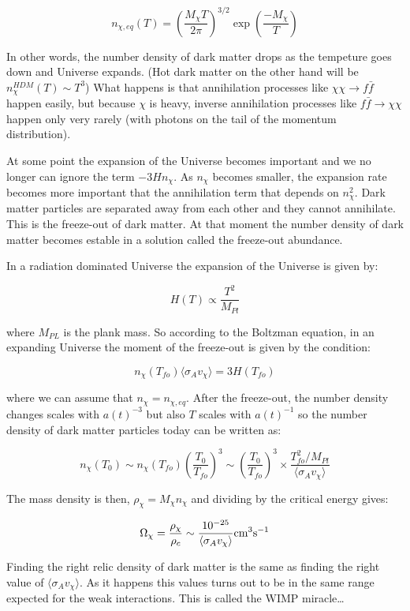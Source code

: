 \documentclass[
  letterpaper,
  DIV=11,
  numbers=noendperiod]{scrreprt}
\begin{document}
\[n_{\chi, eq}(T)  = \left(\frac{M_\chi T}{2\pi}\right)^{3/2} \exp \left(\frac{-M_\chi}{T}\right)\]

In other words, the number density of dark matter drops as the tempeture
goes down and Universe expands. (Hot dark matter on the other hand will
be \(n^{HDM}_\chi(T) \sim T^3\)) What happens is that annihilation
processes like \(\chi \chi \rightarrow f\bar{f}\) happen easily, but
because \(\chi\) is heavy, inverse annihilation processes like
\(f\bar{f} \rightarrow \chi\chi\) happen only very rarely (with photons
on the tail of the momentum distribution).

At some point the expansion of the Universe becomes important and we no
longer can ignore the term \(-3Hn_\chi\). As \(n_\chi\) becomes smaller,
the expansion rate becomes more important that the annihilation term
that depends on \(n^2_\chi\). Dark matter particles are separated away
from each other and they cannot annihilate. This is the freeze-out of
dark matter. At that moment the number density of dark matter becomes
estable in a solution called the freeze-out abundance.

In a radiation dominated Universe the expansion of the Universe is given
by:

\[ H(T) \propto \frac{T^2}{M_{Pl}} \]

where \(M_{PL}\) is the plank mass. So according to the Boltzman
equation, in an expanding Universe the moment of the freeze-out is given
by the condition:

\[n_\chi(T_{fo}) \langle \sigma_{A} v_\chi \rangle =  3H(T_{fo}) \]

where we can assume that \(n_\chi = n_{\chi,eq}\). After the freeze-out,
the number density changes scales with \(a(t)^{-3}\) but also \(T\)
scales with \(a(t)^{-1}\) so the number density of dark matter particles
today can be written as:

\[n_\chi(T_0) \sim n_\chi(T_{fo})\left(\frac{T_0}{T_{fo}}\right)^3 \sim \left(\frac{T_0}{T_{fo}}\right)^3 \times \frac{T_{fo}^2/M_{Pl}}{\langle \sigma_{A} v_\chi \rangle} \]

The mass density is then, \(\rho_\chi = M_\chi n_\chi\) and dividing by
the critical energy gives:

\[\Omega_\chi = \frac{\rho_\chi}{\rho_c} \sim \frac{10^{-25}}{\langle \sigma_{A} v_\chi \rangle} \rm{cm}^3\rm{s}^{-1}\]

Finding the right relic density of dark matter is the same as finding
the right value of \(\langle \sigma_{A} v_\chi \rangle\). As it happens
this values turns out to be in the same range expected for the weak
interactions. This is called the WIMP miracle\ldots{}
\end{document}
